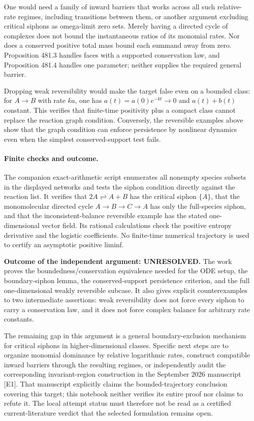 \documentclass[11pt]{article}
\begin{document}
One would need a family of inward barriers that works across all such
relative-rate regimes, including transitions between them, or another
argument excluding critical siphons as omega-limit zero sets. Merely
having a directed cycle of complexes does not bound the instantaneous
ratios of its monomial rates. Nor does a conserved positive total mass
bound each summand away from zero. Proposition 481.3 handles faces with
a supported conservation law, and Proposition 481.4 handles one parameter;
neither supplies the required general barrier.

Dropping weak reversibility would make the target false even on a
bounded class: for $A\to B$ with rate $k a$, one has
$a(t)=a(0)e^{-kt}\to0$ and $a(t)+b(t)$ constant. This verifies that
finite-time positivity plus a compact class cannot replace the reaction
graph condition. Conversely, the reversible examples above show that
the graph condition can enforce persistence by nonlinear dynamics even
when the simplest conserved-support test fails.

\paragraph{Finite checks and outcome.}
The companion exact-arithmetic script enumerates all nonempty species
subsets in the displayed networks and tests the siphon condition directly
against the reaction list. It verifies that $2A\rightleftharpoons A+B$
has the critical siphon $\{A\}$, that the monomolecular directed cycle
$A\to B\to C\to A$ has only the full-species siphon, and that the
inconsistent-balance reversible example has the stated one-dimensional
vector field. Its rational calculations check the positive entropy
derivative and the logistic coefficients. No finite-time numerical
trajectory is used to certify an asymptotic positive liminf.

\textbf{Outcome of the independent argument: UNRESOLVED.} The work
proves the boundedness/conservation equivalence needed for the ODE setup,
the boundary-siphon lemma, the conserved-support persistence criterion,
and the full one-dimensional weakly reversible subcase. It also gives
explicit counterexamples to two intermediate assertions: weak reversibility
does not force every siphon to carry a conservation law, and it does not
force complex balance for arbitrary rate constants.

The remaining gap in this argument is a general boundary-exclusion
mechanism for critical siphons in higher-dimensional classes. Specific
next steps are to organize monomial dominance by relative logarithmic
rates, construct compatible inward barriers through the resulting
regimes, or independently audit the corresponding invariant-region
construction in the September 2026 manuscript [E1]. That manuscript
explicitly claims the bounded-trajectory conclusion covering this target;
this notebook neither verifies its entire proof nor claims to refute it.
The local attempt status must therefore not be read as a certified
current-literature verdict that the selected formulation remains open.
\end{document}
